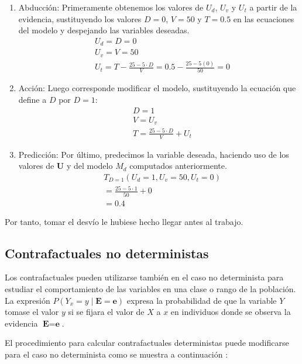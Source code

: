 \begin{enumerate}
	\item Abducción:
	Primeramente obtenemos los valores de $U_d$, $U_v$ y $U_t$ a partir de la evidencia, sustituyendo los valores $D=0$, $V=50$ y $T=0.5$ en las ecuaciones del modelo y despejando las variables deseadas.
	\begin{align*}
		&U_d = D = 0\\
		&U_v = V = 50\\
		&U_t = T -  \frac{25 - 5 \cdot D}{V} = 0.5 - \frac{25 -5(0)}{50} = 0			
	\end{align*}
	\item Acción:
	Luego corresponde modificar el modelo, sustituyendo la ecuación que define a $D$ por $D=1$:
	\begin{align*}
		&D = 1\\
		&V = U_v\\
		&T = \frac{25 - 5 \cdot D}{V} + U_t		
	\end{align*}				
	\item Predicción:
	Por último, predecimos la variable deseada, haciendo uso de los valores de $\textbf{U}$ y del modelo $M_d$ computados anteriormente.
	\begin{align*}
		&T_{D=1}(U_d=1, U_v=50, U_t=0)\\
		&=\frac{25 - 5 \cdot 1}{50} + 0\\
		&=0.4			
	\end{align*}	
\end{enumerate}

Por tanto, tomar el desvío le hubiese hecho llegar antes al trabajo.

\subsection{Contrafactuales no deterministas}			
Los contrafactuales pueden utilizarse también en el caso no determinista para estudiar el comportamiento de las variables en una clase o rango de la población. La expresión $P(Y_x=y \mid \textbf{E}=\textbf{e})$ expresa la probabilidad de que la variable $Y$ tomase el valor $y$ si se fijara el valor de $X$ a $x$ en individuos donde se observa la evidencia $\textbf{E}=\textbf{e}$.

El procedimiento para calcular contrafactuales deterministas puede modificarse para el caso no determinista como se muestra a continuación \cite{pearl2016causal}:

